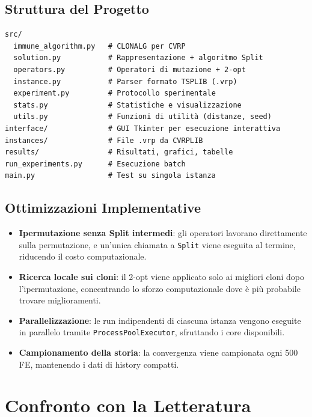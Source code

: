 \documentclass[a4paper,12pt]{article}
\begin{document}
\subsection{Struttura del Progetto}

\begin{verbatim}
src/
  immune_algorithm.py   # CLONALG per CVRP
  solution.py           # Rappresentazione + algoritmo Split
  operators.py          # Operatori di mutazione + 2-opt
  instance.py           # Parser formato TSPLIB (.vrp)
  experiment.py         # Protocollo sperimentale
  stats.py              # Statistiche e visualizzazione
  utils.py              # Funzioni di utilità (distanze, seed)
interface/              # GUI Tkinter per esecuzione interattiva
instances/              # File .vrp da CVRPLIB
results/                # Risultati, grafici, tabelle
run_experiments.py      # Esecuzione batch
main.py                 # Test su singola istanza
\end{verbatim}

\subsection{Ottimizzazioni Implementative}

\begin{itemize}[leftmargin=*]
    \item \textbf{Ipermutazione senza Split intermedi}: gli operatori lavorano direttamente sulla permutazione, e un'unica chiamata a \texttt{Split} viene eseguita al termine, riducendo il costo computazionale.
    \item \textbf{Ricerca locale sui cloni}: il 2-opt viene applicato solo ai migliori cloni dopo l'ipermutazione, concentrando lo sforzo computazionale dove è più probabile trovare miglioramenti.
    \item \textbf{Parallelizzazione}: le run indipendenti di ciascuna istanza vengono eseguite in parallelo tramite \texttt{ProcessPoolExecutor}, sfruttando i core disponibili.
    \item \textbf{Campionamento della storia}: la convergenza viene campionata ogni 500 FE, mantenendo i dati di history compatti.
\end{itemize}


\section{Confronto con la Letteratura}
\end{document}
